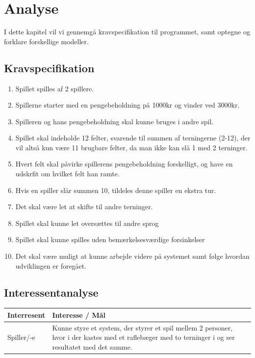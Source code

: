 \chapter{Analyse}

I dette kapitel vil vi gennemgå kravspecifikation til programmet, samt optegne og forklare forskellige modeller.


\section{Kravspecifikation}

\begin{enumerate}
    \item Spillet spilles af 2 spillere.
    \item Spillerne starter med en pengebeholdning på 1000kr og vinder ved 3000kr.
    \item Spilleren og hans pengebeholdning skal kunne bruges i andre spil.
    \item Spillet skal indeholde 12 felter, svarende til summen af terningerne (2-12), der vil altså kun være 11 brugbare felter, da man ikke kan slå 1 med 2 terninger.
    \item Hvert felt skal påvirke spillerens pengebeholdning forskelligt, og have en udskrfit om hvilket felt han ramte.
    \item Hvis en spiller slår summen 10, tildeles denne spiller en ekstra tur.
    \item Det skal være let at skifte til andre terninger.
    \item Spillet skal kunne let oversættes til andre sprog
    \item Spillet skal kunne spilles uden bemærkelsesværdige forsinkelser
    \item Det skal være muligt at kunne arbejde videre på systemet samt følge hvordan udviklingen er foregået.
    \\
\end{enumerate}

\pagebreak



\section{Interessentanalyse}

\begin{center}
    \begin{tabular}{ | l | p{13cm} |}
    \hline
    \textbf{Interresent} & \textbf{Interesse / Mål} \\ \hline
    Spiller/-e & Kunne styre et system, der styrer et spil mellem 2 personer, 
    hvor i der kastes med et raflebæger med to terninger i og ser resultatet med det samme.\\ \hline
    \hline
    \end{tabular}
\end{center}

